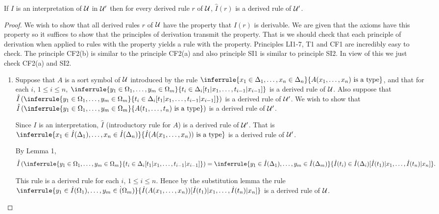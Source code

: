   \begin{lemma}[2]
    If $I$ is an interpretation of $\mathcal{U}$ in $\mathcal{U}'$ then for every derived rule $r$ of $\mathcal{U}$, $\hat I(r)$ is a derived rule of $\mathcal{U}'$.
  \end{lemma}
  \begin{proof}
    We wish to show that all derived rules $r$ of $\mathcal{U}$ have the property that $\hat I(r)$ is derivable.
    We are given that the axioms have this property so it suffices to show that the principles of derivation transmit the property.
    That is we should check that each principle of derivation when applied to rules with the property yields a rule with the property.
    Principles LI1-7, T1 and CF1 are incredibly easy to check.
    The principle CF2(b) is similar to the principle CF2(a) and also principle SI1 is similar to principle SI2.
    In view of this we just check CF2(a) and SI2.

    \begin{enumerate}
      \item[CF2(a)] Suppose that $A$ is a sort symbol of $\mathcal{U}$ introduced by the rule $\inferrule{x_1\in\Delta_1,\ldots,x_n\in\Delta_n}{A(x_1,\ldots,x_n)\isatype}$, and that for each $i$, $1\leq i\leq n$, $\inferrule{y_1\in\Omega_1,\ldots,y_m\in\Omega_m}{t_i\in\Delta_i[t_1|x_1,\ldots,t_{i-1}|x_{i-1}]}$ is a derived rule of $\mathcal{U}$.
        Also suppose that $\hat I\left(\inferrule{y_1\in\Omega_1,\ldots,y_m\in\Omega_m}{t_i\in\Delta_i[t_1|x_1,\ldots,t_{i-1}|x_{i-1}]}\right)$ is a derived rule of $\mathcal{U}'$.
        We wish to show that $\hat I\left(\inferrule{y_1\in\Omega_1,\ldots,y_m\in\Omega_m}{A(t_1,\ldots,t_n)\isatype}\right)$ is a derived rule of $\mathcal{U}'$.

        Since $I$ is an interpretation, $\hat I$ (introductory rule for $A$) is a derived rule of $\mathcal{U}'$.
        That is $\inferrule{x_1\in\dot I(\Delta_1),\ldots,x_n\in\dot I(\Delta_n)}{\dot I(A(x_1,\ldots,x_n))\isatype}$ is a derived rule of $\mathcal{U}'$.

        By Lemma 1,
        \[\hat I\left(\inferrule{y_1\in\Omega_1,\ldots,y_m\in\Omega_m}{t_i\in\Delta_i[t_1|x_1,\ldots,t_{i-1}|x_{i-1}]}\right) = \inferrule{y_1\in\dot I(\Delta_1),\ldots,y_m\in\dot I(\Delta_m)}{\dot I(t_i)\in\dot I(\Delta_i)[\dot I(t_1)|x_1,\ldots,\dot I(t_n)|x_n]}.\]

        This rule is a derived rule for each $i$, $1\leq i\leq n$.
        Hence by the substitution lemma the rule $\inferrule{y_1\in\dot I(\Omega_1),\ldots,y_m\in\dot (\Omega_m)}{\dot I(A(x_1,\ldots,x_n))[\dot I(t_1)|x_1,\ldots,\dot I(t_n)|x_n]}$ is a derived rule of $\mathcal{U}$.


\end{enumerate}
\end{proof}
